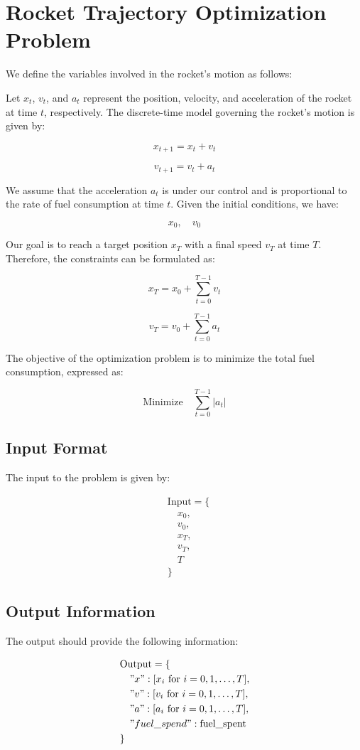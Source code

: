 \documentclass{article}
\begin{document}
\section*{Rocket Trajectory Optimization Problem}

We define the variables involved in the rocket's motion as follows:

Let \( x_t \), \( v_t \), and \( a_t \) represent the position, velocity, and acceleration of the rocket at time \( t \), respectively. The discrete-time model governing the rocket's motion is given by:

\[
x_{t+1} = x_t + v_t
\]

\[
v_{t+1} = v_t + a_t
\]

We assume that the acceleration \( a_t \) is under our control and is proportional to the rate of fuel consumption at time \( t \). Given the initial conditions, we have:

\[
x_0, \quad v_0
\]

Our goal is to reach a target position \( x_T \) with a final speed \( v_T \) at time \( T \). Therefore, the constraints can be formulated as:

\[
x_T = x_0 + \sum_{t=0}^{T-1} v_t
\]

\[
v_T = v_0 + \sum_{t=0}^{T-1} a_t
\]

The objective of the optimization problem is to minimize the total fuel consumption, expressed as:

\[
\text{Minimize} \quad \sum_{t=0}^{T-1} |a_t|
\]

\subsection*{Input Format}

The input to the problem is given by:

\[
\begin{aligned}
&\text{Input} = \{ \\
&\quad x_0, \\
&\quad v_0, \\
&\quad x_T, \\
&\quad v_T, \\
&\quad T \\
&\}
\end{aligned}
\]

\subsection*{Output Information}

The output should provide the following information:

\[
\begin{aligned}
&\text{Output} = \{ \\
&\quad "x": [x_i \text{ for } i = 0, 1, \ldots, T], \\
&\quad "v": [v_i \text{ for } i = 0, 1, \ldots, T], \\
&\quad "a": [a_i \text{ for } i = 0, 1, \ldots, T], \\
&\quad "fuel\_spend": \text{fuel\_spent} \\
&\}
\end{aligned}
\]
\end{document}
